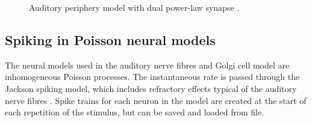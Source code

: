 



\begin{figure}[htb]
  \begin{center}
    \caption[Auditory periphery model]{Auditory periphery model with dual power-law synapse \citep[originally printed in ][]{ZilanyBruceEtAl:2009}.
\label{fig:ZilanyBruceFig}}
  \end{center}
\end{figure}


\subsection{Spiking in Poisson neural models}

The neural models used in the auditory nerve fibres and Golgi cell model are inhomogeneous Poisson processes.
The instantaneous rate is passed through the Jackson spiking model, which includes refractory effects typical of the auditory nerve fibres \citep{Jackson:2003,JacksonCarney:2005}.
Spike trains for each neuron in the model are created at the start of each repetition of the stimulus, but can be saved and loaded from file.






